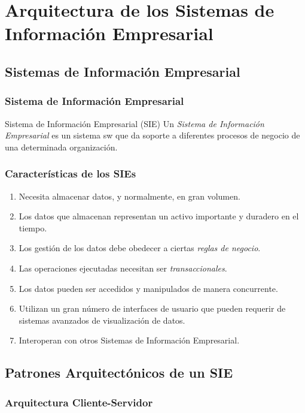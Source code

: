 \documentclass[a4paper,slidestop,xcolor=pst,dvips,blue]{beamer}
\begin{document}
\section{Arquitectura de los Sistemas de Información Empresarial}

\subsection{Sistemas de Información Empresarial}

\begin{frame}[c]
    \frametitle{Sistema de Información Empresarial}
    \begin{block}{Sistema de Información  Empresarial (SIE)}
        Un \emph{Sistema de Información Empresarial} es un sistema sw que da soporte a diferentes procesos de negocio de una determinada organización.
    \end{block}
\end{frame}

\begin{frame}[c]
    \frametitle{Características de los SIEs}
    \begin{enumerate}[<+->]
        \item Necesita almacenar datos, y normalmente, en gran volumen.
        \item Los datos que almacenan representan un activo importante y duradero en el tiempo.
        \item Los gestión de los datos debe obedecer a ciertas \emph{reglas de negocio}.
        \item Las operaciones ejecutadas necesitan ser \emph{transaccionales}.
        \item Los datos pueden ser accedidos y manipulados de manera concurrente.
        \item Utilizan un gran número de interfaces de usuario que pueden requerir de sistemas avanzados de visualización de datos.
        \item Interoperan con otros Sistemas de Información Empresarial.
    \end{enumerate}
\end{frame}

\subsection{Patrones Arquitectónicos de un SIE}

\subsubsection{Arquitectura Cliente-Servidor}
\end{document}
